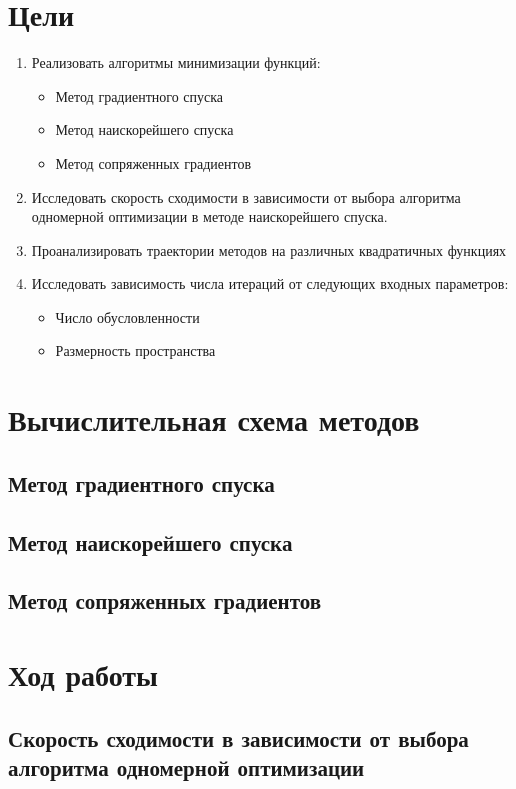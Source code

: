 \section{Цели}
\begin{enumerate} 
\item Реализовать алгоритмы минимизации функций:
	\begin{itemize}
		\item Метод градиентного спуска
		\item Метод наискорейшего спуска
		\item Метод сопряженных градиентов
	\end{itemize}
\item Исследовать скорость сходимости в зависимости от выбора алгоритма одномерной оптимизации в методе наискорейшего спуска.
\item Проанализировать траектории методов на различных квадратичных функциях
\item Исследовать зависимость числа итераций от следующих входных параметров:
	\begin{itemize}
		\item Число обусловленности
		\item Размерность пространства
	\end{itemize}
\end{enumerate}

\section{Вычислительная схема методов}

\subsection{Метод градиентного спуска}
\subsection{Метод наискорейшего спуска}
\subsection{Метод сопряженных градиентов}

\section{Ход работы}

\subsection{Скорость сходимости в зависимости от выбора алгоритма одномерной оптимизации}

